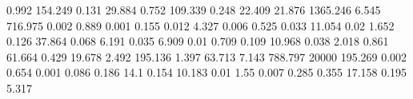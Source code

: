0.992      154.249    %
0.131      29.884     %
0.752      109.339    %
0.248      22.409     %
21.876     1365.246   %
6.545      716.975    %
0.002      0.889      %
0.001      0.155      %
0.012      4.327      %
0.006      0.525      %
0.033      11.054     %
0.02       1.652      %
0.126      37.864     %
0.068      6.191      %
0.035      6.909      %
0.01       0.709      %
0.109      10.968     %
0.038      2.018      %
0.861      61.664     %
0.429      19.678     %
2.492      195.136    %
1.397      63.713     %
7.143      788.797    %
20000      195.269    %
0.002      0.654      %
0.001      0.086      %
0.186      14.1       %
0.154      10.183     %
0.01       1.55       %
0.007      0.285      %
0.355      17.158     %
0.195      5.317      %
